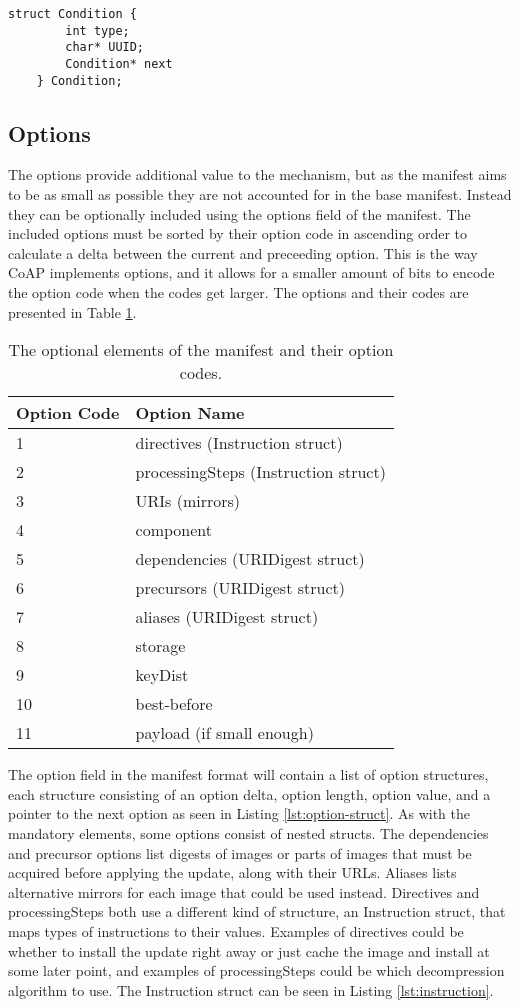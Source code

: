 \documentclass[0-thesis.tex]{subfiles}
\begin{document}
\begin{lstlisting}[caption={The format of vendor, class, and device ID conditions.}, 
                    label={lst:condition-struct}]
    struct Condition {
        int type;
        char* UUID;
        Condition* next
    } Condition;
\end{lstlisting}

\subsection{Options}
\label{ssec:options}
The options provide additional value to the mechanism, but as the manifest aims to be as
small as possible they are not accounted for in the base manifest. Instead they can be
optionally included using the options field of the manifest. The included options must be
sorted by their option code in ascending order to calculate a delta between the current
and preceeding option. This is the way CoAP implements options, and it allows for a
smaller amount of bits to encode the option code when the codes get larger. The options
and their codes are presented in Table \ref{tab:option-codes}.

\begin{longtable}[]{@{}ll@{}}
    \caption{The optional elements of the manifest and their option codes.}
    \label{tab:option-codes}\\
    \toprule
    Option Code & Option Name\tabularnewline
    \midrule
    \endhead
    1 & directives (Instruction struct)\tabularnewline
    2 & processingSteps (Instruction struct)\tabularnewline
    3 & URIs (mirrors)\tabularnewline
    4 & component\tabularnewline
    5 & dependencies (URIDigest struct)\tabularnewline
    6 & precursors (URIDigest struct)\tabularnewline
    7 & aliases (URIDigest struct)\tabularnewline
    8 & storage\tabularnewline
    9 & keyDist\tabularnewline
    10 & best-before\tabularnewline
    11 & payload (if small enough)\tabularnewline
    \bottomrule
\end{longtable}
    

The option field in the manifest format will contain a list of option structures, each
structure consisting of an option delta, option length, option value, and a pointer to the
next option as seen in Listing \ref{lst:option-struct}. As with the mandatory elements,
some options consist of nested structs. The dependencies and precursor options list
digests of images or parts of images that must be acquired before applying the update,
along with their URLs. Aliases lists alternative mirrors for each image that could be used
instead. Directives and processingSteps both use a different kind of structure, an
Instruction struct, that maps types of instructions to their values. Examples of
directives could be whether to install the update right away or just cache the image and
install at some later point, and examples of processingSteps could be which decompression
algorithm to use. The Instruction struct can be seen in Listing \ref{lst:instruction}.
\end{document}
